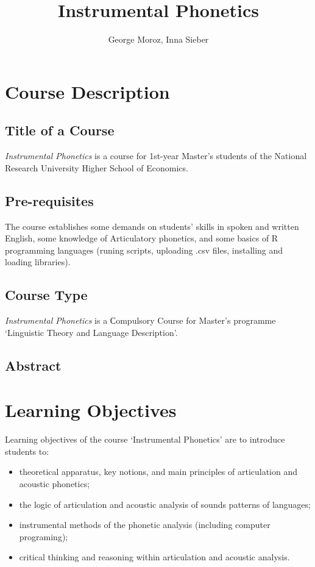 \documentclass[a4paper]{article}
\title{Instrumental Phonetics}
\author{George Moroz, Inna Sieber}
\date{}
\begin{document}
\maketitle
\section{Course Description}
\subsection{Title of a Course}
\textit{Instrumental Phonetics} is a course for 1st-year Master’s students of the National Research University Higher School of Economics.
\subsection{Pre-requisites}
The course establishes some demands on students’ skills in spoken and written English, some knowledge of Articulatory phonetics, and some basics of R programming languages (runing scripts, uploading .csv files, installing and loading libraries).
\subsection{Course Type}
\textit{Instrumental Phonetics} is a Сompulsory Course for Master’s programme ‘Linguistic Theory and Language Description’.
\subsection{Abstract}

\section{Learning Objectives}
\noindent Learning objectives of the course `Instrumental Phonetics' are to introduce students to:
\begin{itemize}
\item theoretical apparatus, key notions, and main principles of articulation and acoustic phonetics;
\item  the logic of articulation and acoustic analysis of sounds patterns of languages;
\item instrumental methods of the phonetic analysis (including  computer programing);
\item critical thinking and reasoning within articulation and acoustic analysis.
\end{itemize}
\end{document}

